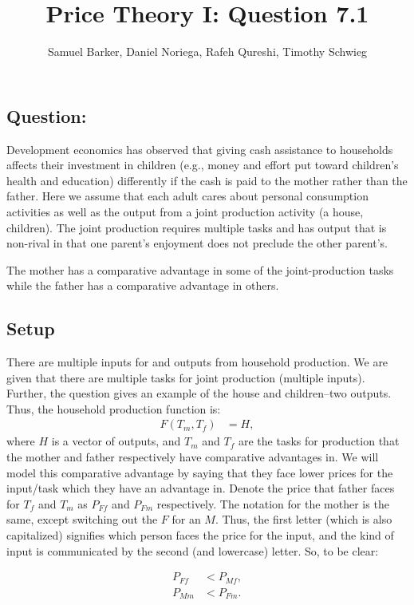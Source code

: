 \documentclass[12pt]{paper}
\title{Price Theory I: Question 7.1}
\author{Samuel Barker, Daniel Noriega, Rafeh Qureshi, Timothy Schwieg}
\begin{document}
\maketitle
\subsection*{Question:}
Development economics has observed that giving cash assistance to
households affects their investment in children (e.g., money and
effort put toward children’s health and education) differently if the
cash is paid to the mother rather than the father. Here we assume that
each adult cares about personal consumption activities as well as the
output from a joint production activity (a house, children). The joint
production requires multiple tasks and has output that is non-rival in
that one parent’s enjoyment does not preclude the other parent’s.

The mother has a comparative advantage in some of the joint-production
tasks while the father has a comparative advantage in others.

\subsection*{Setup}

There are multiple inputs for and outputs from household production. We are given that there are multiple tasks for joint production (multiple inputs). Further, the question gives an example of the house and children--two outputs.
\\

Thus, the household production function is:
\begin{align*}
    F(T_m,T_f)&=H,
\end{align*}
where $H$ is a vector of outputs, and $T_m$ and $T_f$ are the tasks
for production that the mother and father respectively have
comparative advantages in. We will model this comparative advantage by
saying that they face lower prices for the input/task which they have
an advantage in. Denote the price that father faces for $T_f$ and
$T_m$ as $P_{Ff}$ and $P_{Fm}$ respectively. The notation for the
mother is the same, except switching out the $F$ for an $M$. Thus, the
first letter (which is also capitalized) signifies which person faces
the price for the input, and the kind of input is communicated by the
second (and lowercase) letter. So, to be clear:

\begin{align*}
    P_{Ff}&<P_{Mf},\\
    P_{Mm}&<P_{Fm}.
\end{align*}
\end{document}
